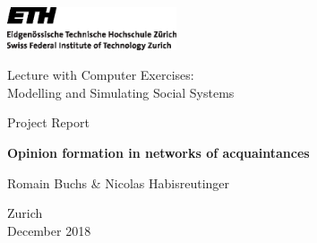 
\thispagestyle{empty}

\begin{center}
\includegraphics[width=5cm]{ETHlogo.eps}

\bigskip


\bigskip


\bigskip


\LARGE{ 	Lecture with Computer Exercises:\\ }
\LARGE{ Modelling and Simulating Social Systems\\}

\bigskip

\bigskip

\small{Project Report}\\

\vspace{2cm}



\hline
\vspace{0.7cm}
\textbf{\LARGE{Opinion formation in networks of acquaintances}}\\
\vspace{1.1cm}
\hline

\bigskip

\bigskip

\bigskip

\LARGE{Romain Buchs \& Nicolas Habisreutinger}



\vspace{6cm}

Zurich\\
December 2018\\

\end{center}


